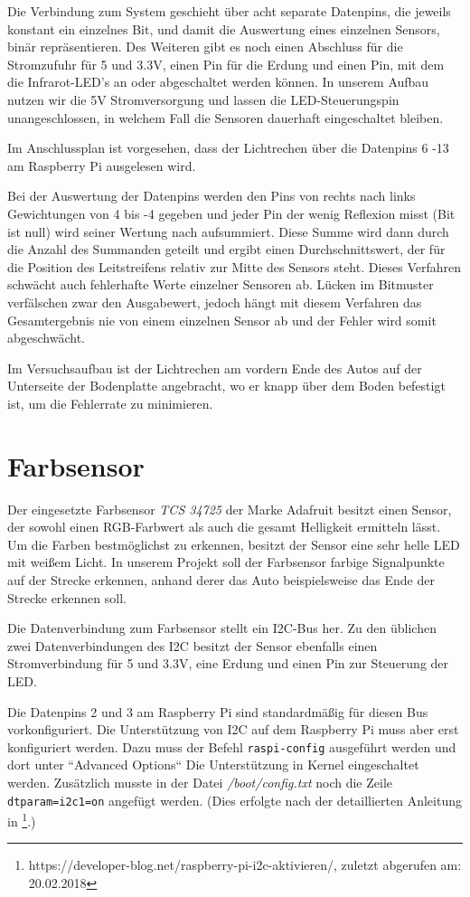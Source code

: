 Die Verbindung zum System geschieht über acht separate Datenpins, die jeweils konstant ein einzelnes Bit, und damit die Auswertung eines einzelnen Sensors, binär repräsentieren. Des Weiteren gibt es noch einen Abschluss für die Stromzufuhr für 5 und 3.3V, einen Pin für die Erdung und einen Pin, mit dem die Infrarot-LED’s an oder abgeschaltet werden können. In unserem Aufbau nutzen wir die 5V Stromversorgung und lassen die LED-Steuerungspin unangeschlossen, in welchem Fall die Sensoren dauerhaft eingeschaltet bleiben. 

Im Anschlussplan ist vorgesehen, dass der Lichtrechen über die Datenpins 6 -13 am Raspberry Pi ausgelesen wird.

Bei der Auswertung der Datenpins werden den Pins von rechts nach links Gewichtungen von 4 bis -4 gegeben und jeder Pin der wenig Reflexion misst (Bit ist null) wird seiner Wertung nach aufsummiert. Diese Summe wird dann durch die Anzahl des Summanden geteilt und ergibt einen Durchschnittswert, der für die Position des Leitstreifens relativ zur Mitte des Sensors steht. Dieses Verfahren schwächt auch fehlerhafte Werte einzelner Sensoren ab. Lücken im Bitmuster verfälschen zwar den Ausgabewert, jedoch hängt mit diesem Verfahren das Gesamtergebnis nie von einem einzelnen Sensor ab und der Fehler wird somit abgeschwächt. 

Im Versuchsaufbau ist der Lichtrechen am vordern Ende des Autos auf der Unterseite der Bodenplatte angebracht, wo er knapp über dem Boden befestigt ist, um die Fehlerrate zu minimieren.


\section{Farbsensor}
Der eingesetzte Farbsensor \emph{TCS 34725} der Marke Adafruit besitzt einen Sensor, der sowohl einen RGB-Farbwert als auch die gesamt Helligkeit ermitteln lässt. Um die Farben bestmöglichst zu erkennen, besitzt der Sensor eine sehr helle LED mit weißem Licht. In unserem Projekt soll der Farbsensor farbige Signalpunkte auf der Strecke erkennen, anhand derer das Auto beispielsweise das Ende der Strecke erkennen soll. 

Die Datenverbindung zum Farbsensor stellt ein I2C-Bus her. Zu den üblichen zwei Datenverbindungen des I2C besitzt der Sensor ebenfalls einen Stromverbindung für 5 und 3.3V, eine Erdung und einen Pin zur Steuerung der LED.

Die Datenpins 2 und 3 am Raspberry Pi sind standardmäßig für diesen Bus vorkonfiguriert. Die Unterstützung von I2C auf dem Raspberry Pi muss aber erst konfiguriert werden. Dazu muss der Befehl \texttt{raspi-config} ausgeführt werden und dort unter “Advanced Options“ Die Unterstützung in Kernel eingeschaltet werden. Zusätzlich musste in der Datei \emph{/boot/config.txt} noch die Zeile \texttt{dtparam=i2c1=on} angefügt werden. (Dies erfolgte nach der detaillierten Anleitung in \footnote{https://developer-blog.net/raspberry-pi-i2c-aktivieren/, zuletzt abgerufen am: 20.02.2018}.)

